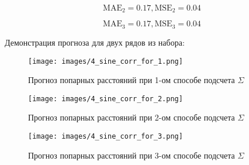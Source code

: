 \documentclass{article}
\begin{document}
\begin{equation}
    \text{MAE}_2 = 0.17, \text{MSE}_2 = 0.04
\end{equation}

\begin{equation}
    \text{MAE}_3 = 0.17, \text{MSE}_3 = 0.04
\end{equation}

Демонстрация прогноза для двух рядов из набора:

\begin{figure}[h]
  \begin{minipage}{0.5\textwidth}
    \centering
    \texttt{[image: images/4\_sine\_corr\_for\_1.png]}
    \caption{Прогноз попарных расстояний при 1-ом способе подсчета $\Sigma$}
  \end{minipage}\hfill
  \begin{minipage}{0.5\textwidth}
    \centering
    \texttt{[image: images/4\_sine\_corr\_for\_2.png]}
    \caption{Прогноз попарных расстояний при 2-ом способе подсчета $\Sigma$}
  \end{minipage}
\end{figure}

\begin{figure}[h]
  \centering
  \begin{minipage}{0.5\textwidth}
    \centering
    \texttt{[image: images/4\_sine\_corr\_for\_3.png]}
    \caption{Прогноз попарных расстояний при 3-ом способе подсчета $\Sigma$}
  \end{minipage}\hfill
\end{figure}



\end{document}

